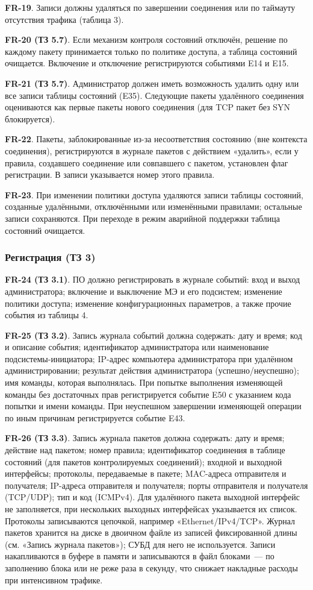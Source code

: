 \documentclass[13pt,a4paper,final]{article}
\begin{document}
	\textbf{FR-19}. Записи должны удаляться по завершении соединения или по таймауту отсутствия трафика (таблица 3).
	
	\textbf{FR-20 (ТЗ 5.7)}. Если механизм контроля состояний отключён, решение по каждому пакету принимается только по политике доступа, а таблица состояний очищается. Включение и отключение регистрируются событиями E14 и E15.
	
	\textbf{FR-21 (ТЗ 5.7)}. Администратор должен иметь возможность удалить одну или все записи таблицы состояний (E35). Следующие пакеты удалённого соединения оцениваются как первые пакеты нового соединения (для TCP пакет без SYN блокируется).
	
	\textbf{FR-22}. Пакеты, заблокированные из-за несоответствия состоянию (вне контекста соединения), регистрируются в журнале пакетов с действием «удалить», если у правила, создавшего соединение или совпавшего с пакетом, установлен флаг регистрации. В записи указывается номер этого правила.
	
	\textbf{FR-23}. При изменении политики доступа удаляются записи таблицы состояний, созданные удалёнными, отключёнными или изменёнными правилами; остальные записи сохраняются. При переходе в режим аварийной поддержки таблица состояний очищается.
	
	\subsubsection{Регистрация (ТЗ 3)}
	
	\textbf{FR-24 (ТЗ 3.1)}. ПО должно регистрировать в журнале событий: вход и выход администратора; включение и выключение МЭ и его подсистем; изменение политики доступа; изменение конфигурационных параметров, а также прочие события из таблицы 4.
	
	\textbf{FR-25 (ТЗ 3.2)}. Запись журнала событий должна содержать: дату и время; код и описание события; идентификатор администратора или наименование подсистемы-инициатора; IP-адрес компьютера администратора при удалённом администрировании; результат действия администратора (успешно/неуспешно); имя команды, которая выполнялась. При попытке выполнения изменяющей команды без достаточных прав регистрируется событие E50 с указанием кода попытки и имени команды. При неуспешном завершении изменяющей операции по иным причинам регистрируется событие E43.
	
	\textbf{FR-26 (ТЗ 3.3)}. Запись журнала пакетов должна содержать: дату и время; действие над пакетом; номер правила; идентификатор соединения в таблице состояний (для пакетов контролируемых соединений); входной и выходной интерфейсы; протоколы, передаваемые в пакете; MAC-адреса отправителя и получателя; IP-адреса отправителя и получателя; порты отправителя и получателя (TCP/UDP); тип и код (ICMPv4). Для удалённого пакета выходной интерфейс не заполняется, при нескольких выходных интерфейсах указывается их список. Протоколы записываются цепочкой, например «Ethernet/IPv4/TCP». Журнал пакетов хранится на диске в двоичном файле из записей фиксированной длины (см. «Запись журнала пакетов»); СУБД для него не используется. Записи накапливаются в буфере в памяти и записываются в файл блоками~--- по заполнению блока или не реже раза в секунду, что снижает накладные расходы при интенсивном трафике.
	
\end{document}
